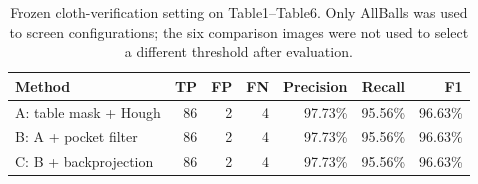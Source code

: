 \begin{table}[htbp]
\centering
\small
\caption{Frozen cloth-verification setting on Table1--Table6. Only AllBalls was used to screen configurations; the six comparison images were not used to select a different threshold after evaluation.}
\label{tab:backprojection-results}
\begin{tabular}{lrrrrrr}
\toprule
Method & TP & FP & FN & Precision & Recall & F1 \\
\midrule
A: table mask + Hough & 86 & 2 & 4 & 97.73\% & 95.56\% & 96.63\% \\
B: A + pocket filter & 86 & 2 & 4 & 97.73\% & 95.56\% & 96.63\% \\
C: B + backprojection & 86 & 2 & 4 & 97.73\% & 95.56\% & 96.63\% \\
\bottomrule
\end{tabular}
\end{table}
\FloatBarrier
